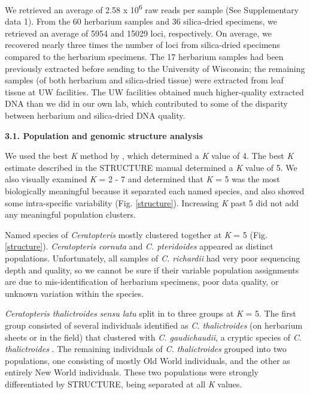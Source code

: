 \documentclass[12pt]{article}
\begin{document}
\begin{flushleft}
We retrieved an average of 2.58 x 10\textsuperscript{6} raw reads per sample (See Supplementary data 1). From the 60 herbarium samples and 36 silica-dried specimens, we retrieved an average of 5954 and 15029 loci, respectively. On average, we recovered nearly three times the number of loci from silica-dried specimens compared to the herbarium specimens. The 17 herbarium samples had been previously extracted before sending to the University of Wisconsin; the remaining samples (of both herbarium and silica-dried tissue) were extracted from leaf tissue at UW facilities. The UW facilities obtained much higher-quality extracted DNA than we did in our own lab, which contributed to some of the disparity between herbarium and silica-dried DNA quality.

\textbf{3.1. Population and genomic structure analysis}

We used the best \textit{K} method by \textcite{Evanno2005}, which determined a \textit{K} value of 4. The best \textit{K} estimate described in the STRUCTURE manual \autocite{Pritchard2000} determined a \textit{K} value of 5. We also visually examined \textit{K} = 2 - 7 and determined that \textit{K} = 5 was the most biologically meaningful because it separated each named species, and also showed some intra-specific variability (Fig. \ref{structure}). Increasing \textit{K} past 5 did not add any meaningful population clusters. 

Named species of \textit{Ceratopteris} mostly clustered together at \textit{K} = 5 (Fig. \ref{structure}). \textit{Ceratopteris cornuta} and \textit{C. pteridoides} appeared as distinct populations. Unfortunately, all samples of \textit{C. richardii} had very poor sequencing depth and quality, so we cannot be sure if their variable population assignments are due to mis-identification of herbarium specimens, poor data quality, or unknown variation within the species.

\textit{Ceratopteris thalictroides} \textit{sensu latu} split in to three groups at \textit{K} = 5. The first group consisted of several individuals identified as \textit{C. thalictroides} (on herbarium sheets or in the field) that clustered with \textit{C. gaudichaudii}, a cryptic species of \textit{C. thalictroides} \autocite{Masuyama2010}. The remaining individuals of \textit{C. thalictroides} grouped into two populations, one consisting of mostly Old World individuals, and the other as entirely New World individuals. These two populations were strongly differentiated by {\small{STRUCTURE}}, being separated at all \textit{K} values.


\end{flushleft}
\end{document}
